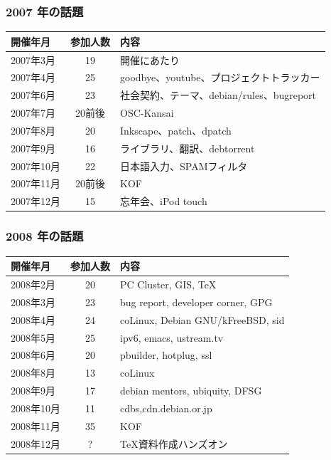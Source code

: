 \documentclass[cjk,dvipdfmx,10pt,compress,%
hyperref={bookmarks=true,bookmarksnumbered=true,bookmarksopen=false,%
colorlinks=false,%
pdftitle={第 121 回 関西 Debian 勉強会},%
pdfauthor={倉敷・のがた・佐々木・かわだ},%
pdfsubject={資料},%
}]{beamer}
\begin{document}
\begin{frame}[fragile]
  \frametitle{2007 年の話題}

    \begin{table}
        \begin{center}
          \begin{tabular}{|l|c|p{16em}|}
            \hline
            開催年月   & 参加人数 & 内容 \\
            \hline
            2007年3月  & 19       & 開催にあたり \\
            2007年4月  & 25       & goodbye、youtube、プロジェクトトラッカー\\
            2007年6月  & 23       & 社会契約、テーマ、debian/rules、bugreport\\
            2007年7月  & 20前後   & OSC-Kansai \\
            2007年8月  & 20       & Inkscape、patch、dpatch\\
            2007年9月  & 16       & ライブラリ、翻訳、debtorrent\\
            2007年10月 & 22       & 日本語入力、SPAMフィルタ\\
            2007年11月 & 20前後   & KOF \\
            2007年12月 & 15       & 忘年会、iPod touch\\
            \hline
          \end{tabular}
        \end{center}
    \end{table}
\end{frame}

\begin{frame}[fragile]
  \frametitle{2008 年の話題}
    \begin{table}
        \begin{center}
          \begin{tabular}{|l|c|p{16em}|}
            \hline
            開催年月   & 参加人数 & 内容 \\
            \hline
            2008年2月  & 20       & PC Cluster, GIS, \TeX \\
            2008年3月  & 23       & bug report, developer corner, GPG \\
            2008年4月  & 24       & coLinux, Debian GNU/kFreeBSD, sid \\
            2008年5月  & 25       & ipv6, emacs, ustream.tv\\
            2008年6月  & 20       & pbuilder, hotplug, ssl\\
            2008年8月  & 13       & coLinux \\
            2008年9月  & 17       & debian mentors, ubiquity, DFSG\\
            2008年10月 & 11       & cdbs,cdn.debian.or.jp \\
            2008年11月 & 35       & KOF \\
            2008年12月 & ?        & TeX資料作成ハンズオン\\
            \hline
          \end{tabular}
        \end{center}
    \end{table}
\end{frame}
\end{document}

